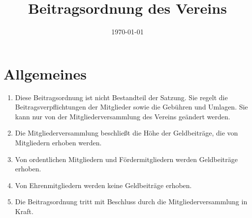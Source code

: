 \documentclass[12pt,a4paper,draft]{article}
\title{Beitragsordnung des Vereins \unsername}
\author{\unsername}
\date{\today}
\begin{document}
\maketitle
\tableofcontents

\section{Allgemeines}
\begin{enumerate}
\item Diese Beitragsordnung ist nicht Bestandteil der Satzung. Sie regelt die 
Beitragsverpflichtungen der Mitglieder sowie die Gebühren und Umlagen. Sie kann 
nur von der Mitgliederversammlung des Vereins geändert werden.

\item Die Mitgliederversammlung beschließt die Höhe der Geldbeiträge, die von 
Mitgliedern erhoben werden.

\item Von ordentlichen Mitgliedern und Fördermitgliedern werden Geldbeiträge 
erhoben.

\item Von Ehrenmitgliedern werden keine Geldbeiträge erhoben.

\item Die Beitragsordnung tritt mit Beschluss durch die Mitgliederversammlung in Kraft.
\end{enumerate}
\end{document}
